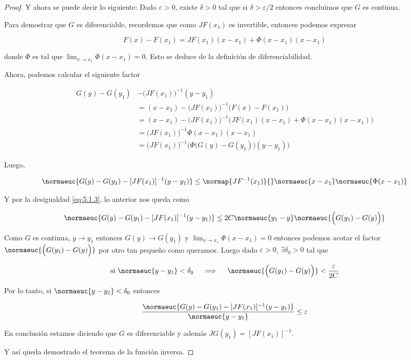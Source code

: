\begin{proof}
    Y ahora se puede decir lo siguiente: Dado $\varepsilon > 0$, existe $\delta > 0$ tal que si $\delta > \varepsilon / 2$ entonces concluimos que $G$ es continua.
    
    Para demostrar que $G$ es diferenciable, recordemos que como $JF(x_1)$ es invertible, entonces podemos expresar
    
    \[
    F(x) - F(x_1) = JF(x_1)(x-x_1) + \Phi(x-x_1)(x-x_1)
    \]
    
    \noindent donde $\Phi$ es tal que $\lim_{x \to x_1} \Phi(x-x_1) = 0$. Esto se deduce de la definición de diferenciabilidad.
    
    Ahora, podemos calcular el siguiente factor
    
    \begin{align*}
        G(y) - G(y_1) &- \Big( JF(x_1) \Big)^{-1}(y-y_1) \\
            &= (x-x_1) - \Big( JF(x_1) \Big)^{-1}\Big( F(x) - F(x_1) \Big) \\
            &= (x-x_1) - \Big( JF(x_1) \Big)^{-1}\Big( JF(x_1)(x-x_1) + \Phi(x-x_1)(x-x_1) \Big) \\
            &= \Big( JF(x_1) \Big)^{-1}\Phi(x-x_1)(x-x_1) \\
            &= \Big( JF(x_1) \Big)^{-1}\Big( \Phi\big( G(y) - G(y_1) \big)(y-y_1) \Big)
    \end{align*}
    
    Luego,
    
    \[
    \normaeuc{G(y) - G(y_1) - [JF(x_1)]^{-1}(y-y_1)} \leq \normap{JF^{-1}(x_1)}{}\normaeuc{x-x_1}\normaeuc{\Phi(x-x_1)}
    \]
    
    Y por la desigualdad \ref{eq:5.1.3}, lo anterior nos queda como
    
    \[
    \normaeuc{G(y) - G(y_1) - [JF(x_1)]^{-1}(y-y_1)} \leq 2C\normaeuc{y_1 - y}\normaeuc{\Big( G(y_1) - G(y) \Big)}
    \]
    
    Como $G$ es continua, $y \to y_1$ entonces $G(y) \to G(y_1)$ y $\lim_{x \to x_1} \Phi(x-x_1) = 0$ entonces podemos acotar el factor $\normaeuc{\Big( G(y_1) - G(y) \Big)}$ por otro tan pequeño como queramos. Luego dado $\varepsilon > 0$, $\exists \delta_0 > 0$ tal que
    
    \[
    \text{si $\normaeuc{y - y_1} < \delta_0$} \quad \implies \quad \normaeuc{\Big( G(y_1) - G(y) \Big)} < \frac{\varepsilon}{2C}
    \]
    
    Por lo tanto, si $\normaeuc{y - y_1} < \delta_0$ entonces
    
    \[
    \dfrac{\normaeuc{G(y) - G(y_1) - [JF(x_1)]^{-1}(y-y_1)}}{\normaeuc{y - y_1}} \leq \varepsilon
    \]
    
    En conclusión estamos diciendo que $G$ es diferenciable y además $JG(y_1) = [JF(x_1)]^{-1}$.
    
    Y así queda demostrado el teorema de la función inversa.
\end{proof}